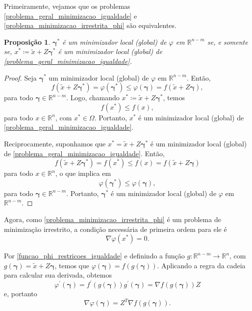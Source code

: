 \documentclass[12pt,a4paper]{scrartcl}
\def\RR{\mathds{R}}
\newtheorem{prop}{Proposição}
\theoremstyle{definition}%
\begin{document}
Primeiramente, vejamos que os problemas \eqref{problema_geral_minimizacao_igualdade} e \eqref{problema_minimizacao_irrestrita_phi} são equivalentes.

\begin{prop}
$\boldsymbol{\gamma}^{*}$ é um minimizador local (global) de $\varphi$ em $\RR^{n-m}$ se, e somente se, $x^{*} \coloneqq  \tilde{x} + Z\boldsymbol{\gamma}^{*}$ é um minimizador local (global) de \eqref{problema_geral_minimizacao_igualdade}.
\end{prop}
\begin{proof}
Seja $\boldsymbol{\gamma}^{*}$ um minimizador local (global) de $\varphi$ em $\RR^{n-m}$. Então,
\[
f(\tilde{x} + Z\boldsymbol{\gamma}^{*} ) = \varphi (\boldsymbol{\gamma}^{*}) \leq \varphi (\boldsymbol{\gamma}) = f(\tilde{x} + Z\boldsymbol{\gamma}) ,
\]
para todo $\boldsymbol{\gamma} \in \RR^{n-m}$. Logo, chamando $x^{*}\coloneqq \tilde{x} + Z\boldsymbol{\gamma}^{*}$, temos
\[
f(x^{*}) \leq f(x),
\]
para todo $x \in \RR^{n}$, com $x^{*} \in \Omega$. Portanto, $x^{*}$ é um minimizador local (global) de \eqref{problema_geral_minimizacao_igualdade}.

Reciprocamente, suponhamos que $x^{*}=\tilde{x} + Z\boldsymbol{\gamma}^{*}$ é um minimizador local (global) de \eqref{problema_geral_minimizacao_igualdade}. Então,
\[
f(\tilde{x} + Z\boldsymbol{\gamma}^{*}) = f(x^{*}) \leq f(x) = f(\tilde{x} + Z\boldsymbol{\gamma})
\]
para todo $x \in \RR^{n}$, o que implica em 
\[
\varphi(\boldsymbol{\gamma}^{*}) \leq \varphi(\boldsymbol{\gamma}) , 
\]
para todo $\boldsymbol{\gamma} \in \RR^{n-m}$. Portanto, $\boldsymbol{\gamma}^{*}$ é um minimizador local (global) de $\varphi$ em $\RR^{n-m}$.
\end{proof}

Agora, como \eqref{problema_minimizacao_irrestrita_phi} é um problema de minimização irrestrito, a condição necessária de primeira ordem para ele é
\[ \label{condicao_1_ordem_phi}
\nabla \varphi(x^{*}) = 0.
\]

Por \eqref{funcao_phi_restricoes_igualdade} e definindo a função $g: \RR^{n-m} \rightarrow \RR^{n}$, com $g(\boldsymbol{\gamma}) = \tilde{x} + Z\boldsymbol{\gamma}$, temos que $\varphi(\boldsymbol{\gamma}) = f(g(\boldsymbol{\gamma}))$. Aplicando a regra da cadeia para calcular sua derivada, obtemos
\[
\varphi^{'} (\boldsymbol{\gamma}) = f^{'}(g(\boldsymbol{\gamma})) g^{'}(\boldsymbol{\gamma}) = \nabla f(g(\boldsymbol{\gamma}))Z 
\]
e, portanto
\[
\nabla \varphi(\boldsymbol{\gamma}) = Z^{T}\nabla f(g(\boldsymbol{\gamma})) .
\]
\end{document}
